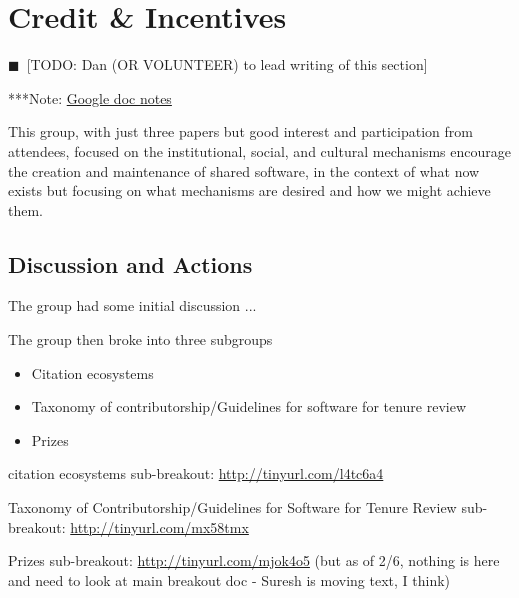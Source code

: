 \documentclass[11pt, oneside]{amsart}
\newcommand{\todo}[1]{{\color{blue}$\blacksquare$~\textsf{[TODO: #1]}}}
\newcommand{\note}[1]{ {\textcolor{blueish}    { ***Note:      #1 }}}
\begin{document}
\section{Credit \& Incentives}
\todo{Dan (OR VOLUNTEER) to lead writing of this section}

\note{\href{http://tinyurl.com/k8ruyn9}{Google doc notes}}

This group, with just three papers but good interest and participation from attendees,
focused on the institutional, social, and cultural mechanisms encourage the creation
and maintenance of shared software, in the context of what now exists but focusing
on what mechanisms are desired and how we might achieve them.


\subsection{Discussion and Actions}

The group had some initial discussion ...

The group then broke into three subgroups
\begin{itemize}
\item Citation ecosystems
\item Taxonomy of contributorship/Guidelines for software for tenure review
\item Prizes
\end{itemize}

citation ecosystems sub-breakout: \url{http://tinyurl.com/l4tc6a4}

Taxonomy of Contributorship/Guidelines for Software for Tenure Review
sub-breakout: \url{http://tinyurl.com/mx58tmx}

Prizes sub-breakout: \url{http://tinyurl.com/mjok4o5}
(but as of 2/6, nothing is here and need to look at main breakout doc - Suresh
is moving text, I think)

\end{document}
